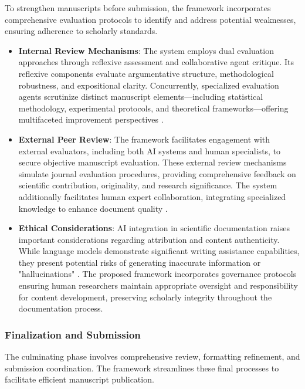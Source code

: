 To strengthen manuscripts before submission, the framework incorporates comprehensive evaluation protocols to identify and address potential weaknesses, ensuring adherence to scholarly standards.

\begin{itemize}

   \item \textbf{Internal Review Mechanisms}: The system employs dual evaluation approaches through reflexive assessment and collaborative agent critique. Its reflexive components evaluate argumentative structure, methodological robustness, and expositional clarity. Concurrently, specialized evaluation agents scrutinize distinct manuscript elements—including statistical methodology, experimental protocols, and theoretical frameworks—offering multifaceted improvement perspectives \cite{lingard2023writing}.
   
   \item \textbf{External Peer Review}: The framework facilitates engagement with external evaluators, including both AI systems and human specialists, to secure objective manuscript evaluation. These external review mechanisms simulate journal evaluation procedures, providing comprehensive feedback on scientific contribution, originality, and research significance. The system additionally facilitates human expert collaboration, integrating specialized knowledge to enhance document quality \cite{dergaa2023human}.
   
   \item \textbf{Ethical Considerations}: AI integration in scientific documentation raises important considerations regarding attribution and content authenticity. While language models demonstrate significant writing assistance capabilities, they present potential risks of generating inaccurate information or "hallucinations" \cite{liu2023overview}. The proposed framework incorporates governance protocols ensuring human researchers maintain appropriate oversight and responsibility for content development, preserving scholarly integrity throughout the documentation process.
    
\end{itemize}

\subsubsection*{Finalization and Submission}

The culminating phase involves comprehensive review, formatting refinement, and submission coordination. The framework streamlines these final processes to facilitate efficient manuscript publication.

